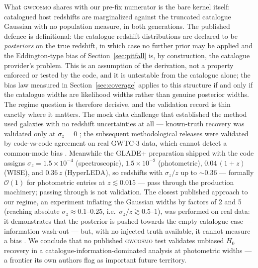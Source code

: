 What \textsc{gwcosmo} shares with our pre-fix numerator is the bare kernel itself: catalogued host redshifts are marginalized against the truncated catalogue Gaussian with no population measure, in both generations. %
The published defence is definitional: the catalogue redshift distributions are declared to be \emph{posteriors} on the true redshift, in which case no further prior may be applied and the Eddington-type bias of Section~\ref{sec:pitfall} is, by construction, the catalogue provider's problem. %
This is an assumption of the derivation, not a property enforced or tested by the code, and it is untestable from the catalogue alone; the bias law measured in Section~\ref{sec:coverage} applies to this structure if and only if the catalogue widths are likelihood widths rather than genuine posterior widths. %
The regime question is therefore decisive, and the validation record is thin exactly where it matters. The mock data challenge that established the method used galaxies with no redshift uncertainties at all --- known-truth recovery was validated only at $\sigma_z = 0$ \citep{Gray:2019ksv}; %
the subsequent methodological releases were validated by code-vs-code agreement on real GWTC-3 data, which cannot detect a common-mode bias \citep{Gray:2021sew, Gray:2023wgj}. %
Meanwhile the GLADE+ preparation shipped with the code assigns $\sigma_z = 1.5\times10^{-4}$ (spectroscopic), $1.5\times10^{-2}$ (photometric), $0.04\,(1+z)$ (WISE), and $0.36\,z$ (HyperLEDA), so redshifts with $\sigma_z/z$ up to $\sim 0.36$ --- formally $\mathcal{O}(1)$ for photometric entries at $z \lesssim 0.015$ --- pass through the production machinery; passing through is not validation. %
The closest published approach to our regime, an experiment inflating the Gaussian widths by factors of 2 and 5 (reaching absolute $\sigma_z \approx 0.1$--$0.25$, i.e.\ $\sigma_z/z \gtrsim 0.5$--$1$), was performed on real data: it demonstrates that the posterior is pushed towards the empty-catalogue case --- information wash-out --- but, with no injected truth available, it cannot measure a bias \citep{Turski:2023lxq}.
We conclude that no published \textsc{gwcosmo} test validates unbiased $H_0$ recovery in a catalogue-information-dominated analysis at photometric widths --- a frontier its own authors flag as important future territory. %

